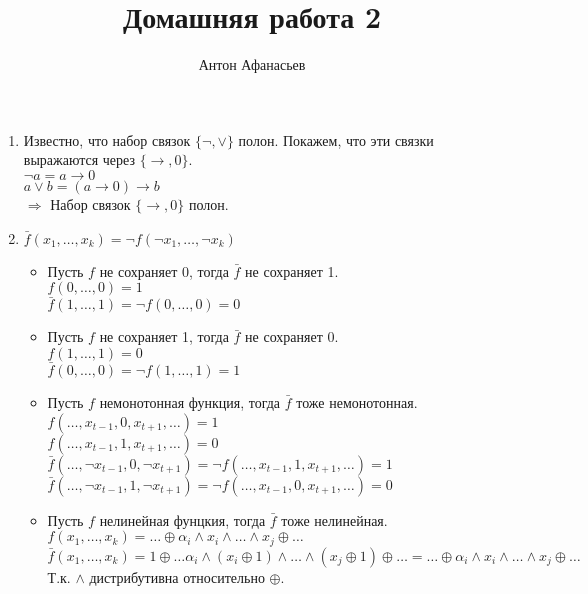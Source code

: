 \documentclass[10pt]{article}
\begin{document}
\title{Домашняя работа 2}
\author{Антон Афанасьев}
\maketitle

\begin{enumerate}[1.]

\item %
Известно, что набор связок $\{\lnot, \lor\}$ полон. Покажем, что эти связки выражаются через $\{ \to, 0\}$.\\
$\lnot a = a \to 0$\\
$a \lor b = (a \to 0) \to b$\\
$\Rightarrow$ Набор связок $\{ \to, 0\}$ полон.

\item %
$\bar f(x_1, \ldots, x_k) = \lnot f(\lnot x_1, \ldots, \lnot x_k)$
\begin{itemize}
	\item Пусть $f$ не сохраняет 0, тогда $\bar f$ не сохраняет 1.\\
	$f(0, \ldots, 0) = 1$\\
	$\bar f(1, \ldots, 1) = \lnot f(0, \ldots, 0) = 0$
	
	\item Пусть $f$ не сохраняет 1, тогда $\bar f$ не сохраняет 0.\\
	$f(1, \ldots, 1) = 0$\\
	$\bar f(0, \ldots, 0) = \lnot f(1, \ldots, 1) = 1$
	
	\item Пусть $f$ немонотонная функция, тогда $\bar f$ тоже немонотонная.\\
	$f(\ldots, x_{t-1}, 0, x_{t+1}, \ldots) = 1$\\
	$f(\ldots, x_{t-1}, 1, x_{t+1}, \ldots) = 0$\\
	$\bar f(\ldots, \lnot x_{t-1}, 0, \lnot x_{t+1}) = \lnot f(\ldots, x_{t-1}, 1, x_{t+1}, \ldots) = 1$\\
	$\bar f(\ldots, \lnot x_{t-1}, 1, \lnot x_{t+1}) = \lnot f(\ldots, x_{t-1}, 0, x_{t+1}, \ldots) = 0$
	
	\item Пусть $f$ нелинейная фунцкия, тогда $\bar f$ тоже нелинейная.\\
	$f(x_1, \ldots, x_k) = \ldots \oplus \alpha_i \land x_i \land \ldots \land x_j \oplus \ldots$\\
	$\bar f(x_1, \ldots, x_k) = 1 \oplus \ldots \alpha_i \land (x_i \oplus 1) \land \ldots \land (x_j \oplus 1) \oplus \ldots = \ldots \oplus \alpha_i \land x_i \land \ldots \land x_j \oplus \ldots$\\
	Т.к. $\land$ дистрибутивна относительно $\oplus$.
	

\end{itemize}
\end{enumerate}
\end{document}
